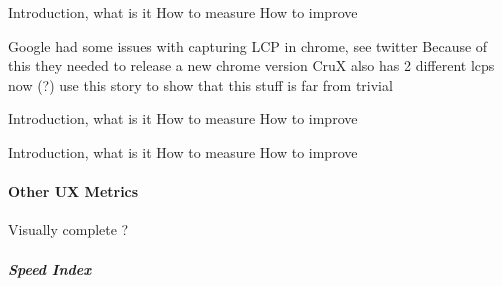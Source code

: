  Introduction, what is it
 How to measure
 How to improve
 
 
 Google had some issues with capturing LCP in chrome, see twitter
 Because of this they needed to release a new chrome version
 CruX also has 2 different lcps now (?)
 use this story to show that this stuff is far from trivial



 Introduction, what is it
 How to measure
 How to improve



 Introduction, what is it
 How to measure
 How to improve








\paragraph{Other UX Metrics}




 Visually complete ?



\subparagraph{Speed Index}



















